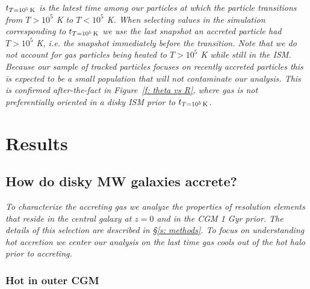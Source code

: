 \documentclass[fleqn,usenatbib]{mnras}
\newcommand{\tcon}{t_{T=10^5\,{\rm K}}}
\begin{document}
\textit{
$\tcon$ is the latest time among our particles at which the particle transitions from $T > 10^5$ K to $T< 10^5$ K.
When selecting values in the simulation corresponding to $\tcon$ we use the last snapshot an accreted particle had $T > 10^5$ K, i.e. the snapshot immediately before the transition.
Note that we do not account for gas particles being heated to $T > 10^5$ K while still in the ISM.
Because our sample of tracked particles focuses on recently accreted particles this is expected to be a small population that will not contaminate our analysis.
This is confirmed after-the-fact in Figure~\ref{f: theta vs R}, where gas is not preferentially oriented in a disky ISM prior to $\tcon$.
}

\section{Results}
\label{s: results}


\subsection{How do disky MW galaxies accrete?}
\label{s: characteristics}

\textit{
To characterize the accreting gas we analyze the properties of resolution elements that reside in the central galaxy at $z=0$ and in the CGM 1 Gyr prior.
The details of this selection are described in \S\ref{s: methods}.
To focus on understanding hot accretion we center our analysis on the last time gas cools out of the hot halo prior to accreting.
}


\subsubsection{Hot in outer CGM}
\label{s: inflowing gas phase}
\end{document}

